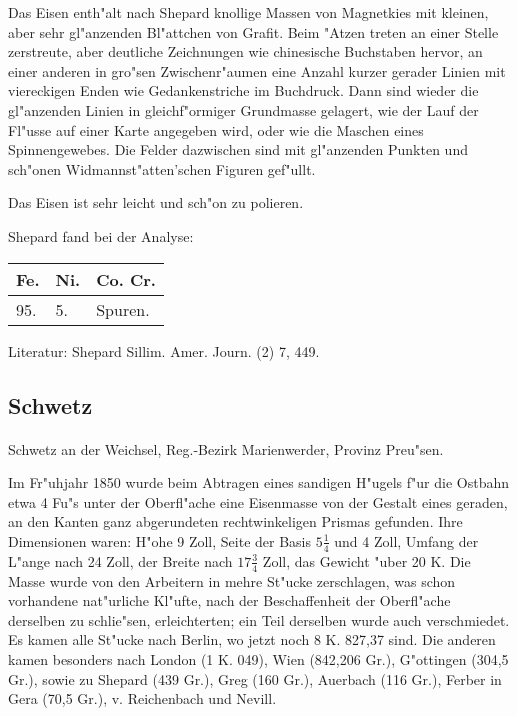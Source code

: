 \documentclass[a4paper, 11pt, oneside]{article}
\begin{document}
Das Eisen enth"alt nach Shepard knollige Massen von Magnetkies mit kleinen, aber sehr gl"anzenden Bl"attchen von Grafit. Beim "Atzen treten an einer Stelle zerstreute, aber deutliche Zeichnungen wie chinesische Buchstaben hervor, an einer anderen in gro"sen Zwischenr"aumen eine Anzahl kurzer gerader Linien mit viereckigen Enden wie Gedankenstriche im Buchdruck. Dann sind wieder die gl"anzenden Linien in gleichf"ormiger Grundmasse gelagert, wie der Lauf der Fl"usse auf einer Karte angegeben wird, oder wie die Maschen eines Spinnengewebes. Die Felder dazwischen sind mit gl"anzenden Punkten und sch"onen Widmannst"atten'schen Figuren gef"ullt.

Das Eisen ist sehr leicht und sch"on zu polieren.

Shepard fand bei der Analyse:
\begin{table}[H]
    \centering
    \begin{tabular}{l l l}
        Fe. & Ni. & Co. Cr. \\ \hline
        95. & 5. & Spuren. \\
    \end{tabular}
\end{table}

\footnotesize
Literatur: Shepard Sillim. Amer. Journ. (2) 7, 449.

\subsection{Schwetz}
\normalsize
\paragraph{}
Schwetz an der Weichsel, Reg.-Bezirk Marienwerder, Provinz Preu"sen.

Im Fr"uhjahr 1850 wurde beim Abtragen eines sandigen H"ugels f"ur die Ostbahn etwa 4 Fu"s unter der Oberfl"ache eine Eisenmasse von der Gestalt eines geraden, an den Kanten ganz abgerundeten rechtwinkeligen Prismas gefunden. Ihre Dimensionen waren: H"ohe 9 Zoll, Seite der Basis $5\frac{1}{4}$ und 4 Zoll, Umfang der L"ange nach 24 Zoll, der Breite nach $17\frac{3}{4}$ Zoll, das Gewicht "uber 20 K. Die Masse wurde von den Arbeitern in mehre St"ucke zerschlagen, was schon vorhandene nat"urliche Kl"ufte, nach der Beschaffenheit der Oberfl"ache derselben zu schlie"sen, erleichterten; ein Teil derselben wurde auch verschmiedet. Es kamen alle St"ucke nach Berlin, wo jetzt noch 8 K. 827,37 sind. Die anderen kamen besonders nach London (1 K. 049), Wien (842,206 Gr.), G"ottingen (304,5 Gr.), sowie zu Shepard (439 Gr.), Greg (160 Gr.), Auerbach (116 Gr.), Ferber in Gera (70,5 Gr.), v. Reichenbach und Nevill.
\end{document}
